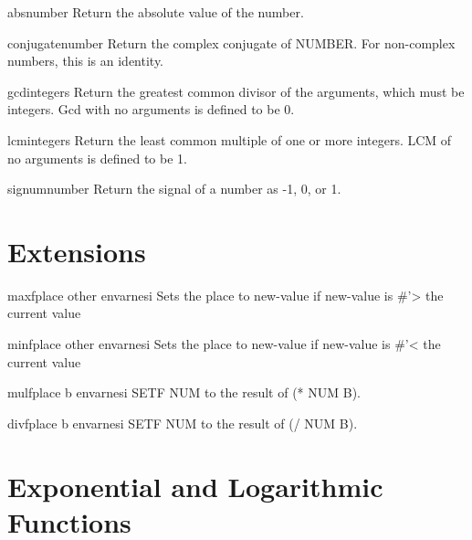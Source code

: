\begin{function}{abs}{number}{}{}
  Return the absolute value of the number.
\end{function}

\begin{function}{conjugate}{number}{}{}
  Return the complex conjugate of NUMBER. For non-complex numbers, this is
  an identity.
\end{function}

\begin{function}{gcd}{\rest integers}{}{}
  Return the greatest common divisor of the arguments, which must be
  integers. Gcd with no arguments is defined to be 0.
\end{function}

\begin{function}{lcm}{\rest integers}{}{}
  Return the least common multiple of one or more integers. LCM of no
  arguments is defined to be 1.
\end{function}

\begin{function}{signum}{number}{}{}
  Return the signal of a number as -1, 0, or 1.
\end{function}

\section{Extensions}
\label{sec:extensions-1}

\begin{macro}{maxf}{place other \env env}{arnesi}{}
  Sets the place to new-value if new-value is \#'> the current value
\end{macro}

\begin{macro}{minf}{place other \env env}{arnesi}{}
  Sets the place to new-value if new-value is \#'< the current value
\end{macro}

\begin{macro}{mulf}{place b \env env}{arnesi}{}
  SETF NUM to the result of (* NUM B).
\end{macro}

\begin{macro}{divf}{place b \env env}{arnesi}{}
  SETF NUM to the result of (/ NUM B).
\end{macro}

\section{Exponential and Logarithmic Functions}
\label{sec:expon-logar-funct}

